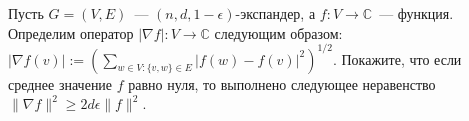 Пусть $G = (V, E)$~--- $(n, d, 1 - \epsilon)$-экспандер, а $f: V \rightarrow \mathbb{C}$~--- функция. Определим оператор
$|\nabla f|: V \rightarrow \mathbb{C}$ следующим образом: $|\nabla f(v)| := (\sum\limits_{w \in V: \{v, w\} \in E} |f(w) -
f(v)|^2)^{1 / 2}$. Покажите, что если среднее значение $f$ равно нуля, то выполнено следующее неравенство $\| \nabla f \|^2
\ge 2 d \epsilon \| f \|^2$.